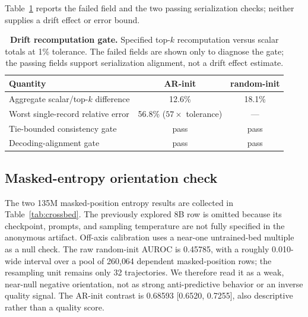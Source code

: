 \documentclass{article}
\newcommand{\armA}{AR-init}
\newcommand{\armB}{random-init}
\begin{document}
Table~\ref{tab:driftgate} reports the failed field and the two passing
serialization checks; neither supplies a drift effect or error bound.

\begin{table}[!t]
  \caption{\textbf{Drift recomputation gate.}  Specified top-$k$
  recomputation versus scalar totals at 1\% tolerance.  The failed fields are
  shown only to diagnose the gate; the passing fields support serialization
  alignment, not a drift effect estimate.}
  \label{tab:driftgate}
  \centering
  \small
  \setlength{\tabcolsep}{4pt}
  \begin{tabular}{@{}lcc@{}}
    \toprule
    Quantity & \armA{} & \armB{} \\
    \midrule
    Aggregate scalar/top-$k$ difference & 12.6\% & 18.1\% \\
    Worst single-record relative error & 56.8\% ($57\times$ tolerance) & --- \\
    Tie-bounded consistency gate & pass & pass \\
    Decoding-alignment gate & pass & pass \\
    \bottomrule
  \end{tabular}
\end{table}

\subsection{Masked-entropy orientation check}
\label{sec:crossbed}

The two 135M masked-position entropy results are collected in
Table~\ref{tab:crossbed}.  The previously explored 8B row is omitted because
its checkpoint, prompts, and sampling temperature are not fully specified in
the anonymous artifact.  Off-axis calibration uses a near-one untrained-bed
multiple as a null check.  The raw \armB{} AUROC is 0.45785, with a roughly
0.010-wide interval over a pool of 260{,}064 dependent masked-position rows;
the resampling unit remains only 32 trajectories.  We therefore read it as a
weak, near-null negative orientation, not as strong anti-predictive behavior
or an inverse quality signal.  The \armA{} contrast is 0.68593
[0.6520, 0.7255], also descriptive rather than a quality score.
\end{document}
